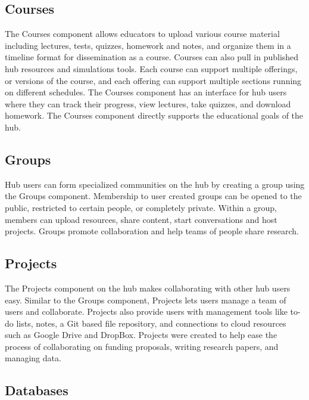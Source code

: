 \subsection{Courses}
\label{ssec:hub_components_courses}

The Courses component allows educators to upload various course material
including lectures, tests, quizzes, homework and notes, and organize them in a
timeline format for dissemination as a course. Courses can also pull in
published hub resources and simulations tools. Each course can support multiple
offerings, or versions of the course, and each offering can support multiple
sections running on different schedules. The Courses component has an interface
for hub users where they can track their progress, view lectures, take
quizzes, and download homework.  The Courses component directly supports the
educational goals of the hub.



\subsection{Groups}
\label{ssec:hub_components_groups}

Hub users can form specialized communities on the hub by creating a group using
the Groups component. Membership to user created groups can be opened to the
public, restricted to certain people, or completely private. Within a group,
members can upload resources, share content, start conversations and host
projects.  Groups promote collaboration and help teams of people share
research.

\subsection{Projects}
\label{ssec:hub_components_projects}

The Projects component on the hub makes collaborating with other hub users
easy. Similar to the Groups component, Projects lets users manage a team of users
and collaborate. Projects also provide users with management tools like to-do
lists, notes, a Git based file repository, and connections to cloud resources
such as Google Drive and DropBox. Projects were created to help ease the
process of collaborating on funding proposals, writing research papers, and
managing data.

\subsection{Databases}
\label{ssec:hub_components_databases}

